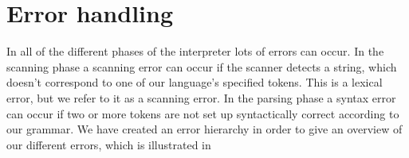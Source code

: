 \section{Error handling}

In all of the different phases of the interpreter lots of errors can occur. In the scanning phase
a scanning error can occur if the scanner detects a string, which doesn't correspond to one of our language's specified tokens.
This is a lexical error, but we refer to it as a scanning error. In the parsing phase a syntax error can occur if two or more
tokens are not set up syntactically correct according to our grammar. We have created an error hierarchy in order to give an
overview of our different errors, which is illustrated in 

    
